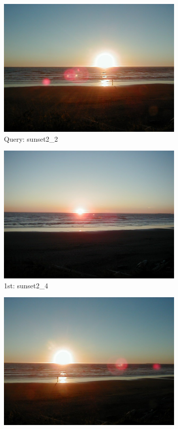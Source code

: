 \begin{itemize}
\begin{figure}[H]
	\centering
	\begin{subfigure}{0.25\textwidth}
	  \centering
	  \includegraphics[width=0.9\linewidth]{../input/sunset2_2.jpg}
	  \caption{Query: sunset2\_2}
	\end{subfigure}%
	\begin{subfigure}{0.25\textwidth}
	  \centering
	  \includegraphics[width=0.9\linewidth]{../input/sunset2_4.jpg}
	  \caption{1st: sunset2\_4}
	\end{subfigure}%
	\begin{subfigure}{0.25\textwidth}
        \centering
        \includegraphics[width=0.9\linewidth]{../input/sunset2_3.jpg}

\end{subfigure}
\end{figure}
\end{itemize}
